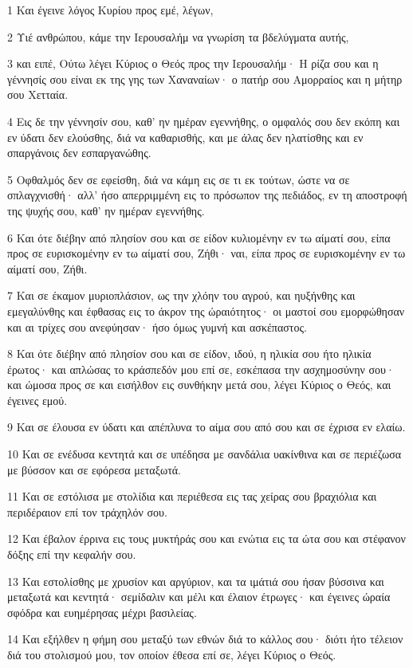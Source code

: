 \par 1 Και έγεινε λόγος Κυρίου προς εμέ, λέγων,
\par 2 Υιέ ανθρώπου, κάμε την Ιερουσαλήμ να γνωρίση τα βδελύγματα αυτής,
\par 3 και ειπέ, Ούτω λέγει Κύριος ο Θεός προς την Ιερουσαλήμ· Η ρίζα σου και η γέννησίς σου είναι εκ της γης των Χαναναίων· ο πατήρ σου Αμορραίος και η μήτηρ σου Χετταία.
\par 4 Εις δε την γέννησίν σου, καθ' ην ημέραν εγεννήθης, ο ομφαλός σου δεν εκόπη και εν ύδατι δεν ελούσθης, διά να καθαρισθής, και με άλας δεν ηλατίσθης και εν σπαργάνοις δεν εσπαργανώθης.
\par 5 Οφθαλμός δεν σε εφείσθη, διά να κάμη εις σε τι εκ τούτων, ώστε να σε σπλαγχνισθή· αλλ' ήσο απερριμμένη εις το πρόσωπον της πεδιάδος, εν τη αποστροφή της ψυχής σου, καθ' ην ημέραν εγεννήθης.
\par 6 Και ότε διέβην από πλησίον σου και σε είδον κυλιομένην εν τω αίματί σου, είπα προς σε ευρισκομένην εν τω αίματί σου, Ζήθι· ναι, είπα προς σε ευρισκομένην εν τω αίματί σου, Ζήθι.
\par 7 Και σε έκαμον μυριοπλάσιον, ως την χλόην του αγρού, και ηυξήνθης και εμεγαλύνθης και έφθασας εις το άκρον της ώραιότητος· οι μαστοί σου εμορφώθησαν και αι τρίχες σου ανεφύησαν· ήσο όμως γυμνή και ασκέπαστος.
\par 8 Και ότε διέβην από πλησίον σου και σε είδον, ιδού, η ηλικία σου ήτο ηλικία έρωτος· και απλώσας το κράσπεδόν μου επί σε, εσκέπασα την ασχημοσύνην σου· και ώμοσα προς σε και εισήλθον εις συνθήκην μετά σου, λέγει Κύριος ο Θεός, και έγεινες εμού.
\par 9 Και σε έλουσα εν ύδατι και απέπλυνα το αίμα σου από σου και σε έχρισα εν ελαίω.
\par 10 Και σε ενέδυσα κεντητά και σε υπέδησα με σανδάλια υακίνθινα και σε περιέζωσα με βύσσον και σε εφόρεσα μεταξωτά.
\par 11 Και σε εστόλισα με στολίδια και περιέθεσα εις τας χείρας σου βραχιόλια και περιδέραιον επί τον τράχηλόν σου.
\par 12 Και έβαλον έρρινα εις τους μυκτήράς σου και ενώτια εις τα ώτα σου και στέφανον δόξης επί την κεφαλήν σου.
\par 13 Και εστολίσθης με χρυσίον και αργύριον, και τα ιμάτιά σου ήσαν βύσσινα και μεταξωτά και κεντητά· σεμίδαλιν και μέλι και έλαιον έτρωγες· και έγεινες ώραία σφόδρα και ευημέρησας μέχρι βασιλείας.
\par 14 Και εξήλθεν η φήμη σου μεταξύ των εθνών διά το κάλλος σου· διότι ήτο τέλειον διά του στολισμού μου, τον οποίον έθεσα επί σε, λέγει Κύριος ο Θεός.
